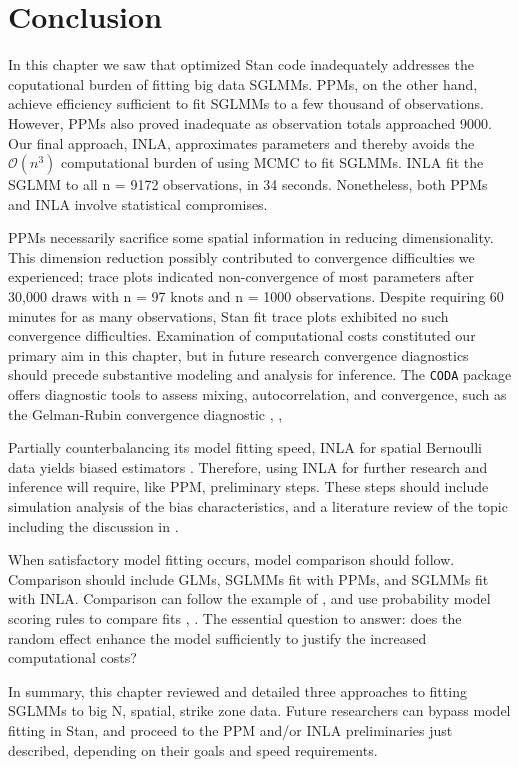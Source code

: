 \section{Conclusion}
In this chapter we saw that optimized Stan code inadequately addresses the coputational burden of fitting big data SGLMMs. PPMs, on the other hand, achieve efficiency sufficient to fit SGLMMs to a few thousand of observations. However, PPMs also proved inadequate as observation totals approached 9000. Our final approach, INLA, approximates parameters and thereby avoids the $\mathcal{O}(n^{3})$ computational burden of using MCMC to fit SGLMMs. INLA fit the SGLMM to all n = 9172 observations, in 34 seconds. Nonetheless, both PPMs and INLA involve statistical compromises.

PPMs necessarily sacrifice some spatial information in reducing dimensionality. This dimension reduction possibly contributed to convergence difficulties we experienced; trace plots indicated non-convergence of most parameters after 30,000 draws with n = 97 knots and n = 1000 observations. Despite requiring 60 minutes for as many observations, Stan fit trace plots exhibited no such convergence difficulties. Examination of computational costs constituted our primary aim in this chapter, but in future research convergence diagnostics should precede substantive modeling and analysis for inference. The \verb|CODA| package offers diagnostic tools to assess mixing, autocorrelation, and convergence, such as the Gelman-Rubin convergence diagnostic \citep{CODA}, \citep{Gelman2014}, \citep{Brooks1998}

Partially counterbalancing its model fitting speed, INLA for spatial Bernoulli data yields biased estimators \citep{Mondal2017}. Therefore, using INLA for further research and inference will require, like PPM, preliminary steps. These steps should include simulation analysis of the bias characteristics, and a literature review of the topic including the discussion in \cite{Rue2007}. 

When satisfactory model fitting occurs, model comparison should follow. Comparison should include GLMs, SGLMMs fit with PPMs, and SGLMMs fit with INLA. Comparison can follow the example of \cite{Finley2009_2}, and use probability model scoring rules to compare fits \citep{Bickel2007}, \citep{Gneiting2007}. The essential question to answer: does the random effect enhance the model sufficiently to justify the increased computational costs?

In summary, this chapter reviewed and detailed three approaches to fitting SGLMMs to big N, spatial, strike zone data. Future researchers can bypass model fitting in Stan, and proceed to the PPM and/or INLA preliminaries just described, depending on their goals and speed requirements.
